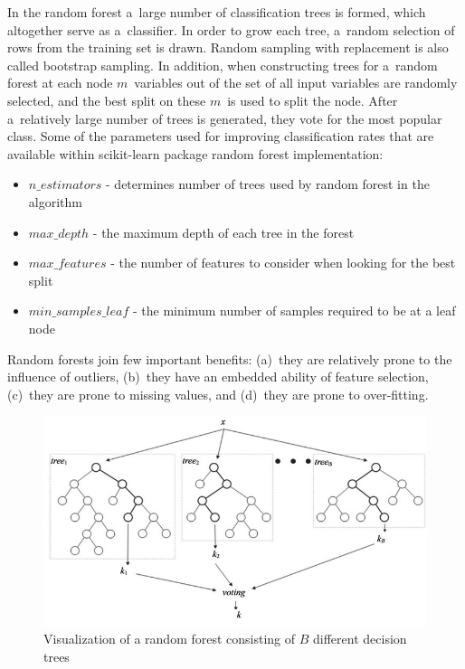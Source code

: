 In the random forest a~large number of classification trees is formed, which altogether serve as a~classifier. In order to grow each tree, a~random selection of rows from the training set is drawn. Random sampling with replacement is also called bootstrap sampling. In addition, when constructing trees for a~random forest at each node $m$~variables out of the set of all input variables are randomly selected, and the best split on these $m$~is used to split the node. After a~relatively large number of trees is generated, they vote for the most popular class. Some of the parameters used for improving classification rates that are available within scikit-learn package random forest implementation:

\begin{itemize}
	\item $n\_estimators$ - determines number of trees used by random forest in the algorithm
	\item $max\_depth$ - the maximum depth of each tree in the forest
	\item $max\_features$ - the number of features to consider when looking for the best split
	\item $min\_samples\_leaf$ - the minimum number of samples required to be at a leaf node
\end{itemize}

Random forests join few important benefits: (a)~they are relatively prone to the influence of outliers, (b)~they have an embedded ability of feature selection, (c)~they are prone to missing values, and (d)~they are prone to over-fitting.

\begin{figure}[htp]
	\centering
	\includegraphics[width=1.0\textwidth]{Figures/rf_visualization.jpg}
	\caption{Visualization of a random forest consisting of $B$ different decision trees}
	\label{fig:rf_visualization}\vspace{-3pt}
\end{figure}